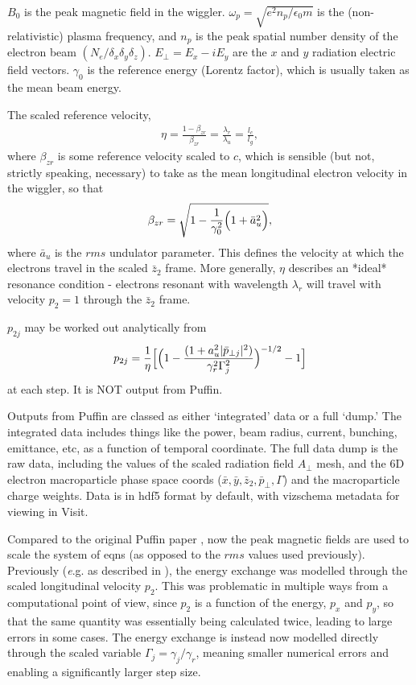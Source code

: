 \documentclass[12pt]{article}%
\begin{document}
$B_0$ is the peak magnetic field in the wiggler.
$\omega_p = \sqrt{e^2 n_p / \epsilon_0 m}$ is the (non-relativistic) plasma frequency, and $n_p$ is the peak spatial number density of the electron beam $(N_e / \delta_x \delta_y \delta_z)$.
$E_\bot = E_x - i E_y$ are the $x$ and $y$ radiation electric field vectors. $\gamma_0$ is the reference energy (Lorentz factor), which is usually taken as the mean beam energy.

The scaled reference velocity,
\begin{align}
\eta = \frac{1 - \beta_{zr}}{\beta_{zr}} = \frac{\lambda_r}{\lambda_u} = \frac{l_c}{l_g},
\end{align}
where $\beta_{zr}$ is some reference velocity scaled to $c$, which is sensible (but not, strictly speaking, necessary) to take as the mean longitudinal electron velocity in the wiggler, so that
\begin{align}
\beta_{zr} = \sqrt{ 1 - \frac{1}{\gamma_0^2}\Bigl(1 + \bar{a}_u^2\Bigr)},
\end{align}
where $\bar{a}_u$ is the $rms$ undulator parameter.
This defines the velocity at which the electrons travel in the scaled $\bar{z}_2$ frame. More generally, $\eta$ describes an *ideal* resonance condition - electrons resonant with wavelength $\lambda_r$ will travel with velocity $p_2=1$ through the $\bar{z}_2$ frame.




$p_{2j}$ may be worked out analytically from
\begin{align}
p_{2j} = \frac{1}{\eta}\Bigl[ \Bigl(  1 - \frac{(1 + a_u^2 | \bar{p}_{\bot j} |^2)}{\gamma_r^2 \Gamma^2_j}  \Bigr)^{-1/2} - 1   \Bigr]
\end{align}
at each step. It is NOT output from Puffin.

Outputs from Puffin are classed as either `integrated' data or a full `dump.' The integrated data includes things like the power, beam radius, current, bunching, emittance, etc, as a function of temporal coordinate. The full data dump is the raw data, including the values of the scaled radiation field $A_\bot$ mesh, and the $6$D electron macroparticle phase space coords ($\bar{x}, \bar{y}, \bar{z}_2, \bar{p}_\bot, \Gamma$) and the macroparticle charge weights. Data is in hdf5 format by default, with vizschema metadata for viewing in Visit.

Compared to the original Puffin paper \cite{puffin}, now the peak magnetic fields are used to scale the system of eqns (as opposed to the $rms$ values used previously). Previously (\textit e.g. as described in \cite{puffin}), the energy exchange was modelled through the scaled longitudinal velocity $p_2$. This was problematic in multiple ways from a computational point of view, since $p_2$ is a function of the energy, $p_x$ and $p_y$, so that the same quantity was essentially being calculated twice, leading to large errors in some cases. The energy exchange is instead now modelled directly through the scaled variable $\Gamma_j = \gamma_j / \gamma_r$, meaning smaller numerical errors and enabling a significantly larger step size.
\end{document}
